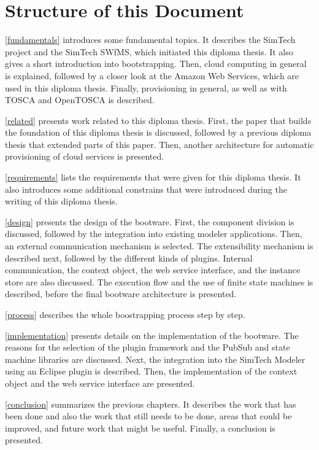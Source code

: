 \section{Structure of this Document}

\autoref{fundamentals} introduces some fundamental topics.
It describes the SimTech project and the SimTech SWfMS, which initiated this diploma thesis.
It also gives a short introduction into bootstrapping.
Then, cloud computing in general is explained, followed by a closer look at the Amazon Web Services, which are used in this diploma thesis.
Finally, provisioning in general, as well as with TOSCA and OpenTOSCA is described.

\autoref{related} presents work related to this diploma thesis.
First, the paper that builds the foundation of this diploma thesis is discussed, followed by a previous diploma thesis that extended parts of this paper.
Then, another architecture for automatic provisioning of cloud services is presented.

\autoref{requirements} lists the requirements that were given for this diploma thesis.
It also introduces some additional constrains that were introduced during the writing of this diploma thesis.

\autoref{design} presents the design of the bootware.
First, the component division is discussed, followed by the integration into existing modeler applications.
Then, an external communication mechanism is selected.
The extensibility mechanism is described next, followed by the different kinds of plugins.
Internal communication, the context object, the web service interface, and the instance store are also discussed.
The execution flow and the use of finite state machines is described, before the final bootware architecture is presented.

\autoref{process} describes the whole boostrapping process step by step.

\autoref{implementation} presents details on the implementation of the bootware.
The reasons for the selection of the plugin framework and the PubSub and state machine libraries are discussed.
Next, the integration into the SimTech Modeler using an Eclipse plugin is described.
Then, the implementation of the context object and the web service interface are presented.

\autoref{conclusion} summarizes the previous chapters.
It describes the work that has been done and also the work that still needs to be done, areas that could be improved, and future work that might be useful.
Finally, a conclusion is presented.
